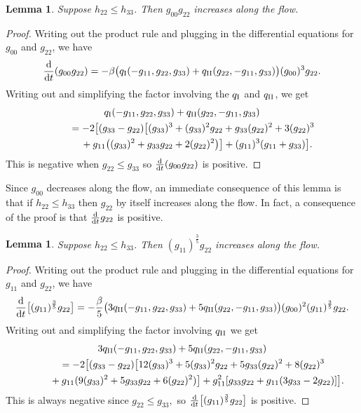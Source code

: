 \documentclass[pdftex]{sigma}
\numberwithin{equation}{section}
\newtheorem{Lemma}[Theorem]{Lemma}
\newcommand{\dtime}{\frac{{\rm d}}{{\rm d} t}} %
\begin{document}
\begin{Lemma} \label{g00g22prodlemma}
Suppose $h_{22} \leq h_{33}$. Then $g_{00} g_{22}$ increases along the flow.
\end{Lemma}
\begin{proof}
Writing out the product rule and plugging in the differential equations for $g_{00}$ and $g_{22}$, we have
\[
\dtime (g_{00} g_{22})
	= -\beta \bigl(q_{\rm I}(-g_{11}, g_{22}, g_{33}) + q_{\rm II}(g_{22}, -g_{11}, g_{33})\bigr) (g_{00})^3 g_{22}.
\]
Writing out and simplifying the factor involving the $q_{\rm I}$ and $q_{\rm II}$, we get
\begin{gather*}
q_{\rm I}(-g_{11}, g_{22}, g_{33}) + q_{\rm II}(g_{22}, -g_{11}, g_{33}) \\
 \qquad{} = -2\big[(g_{33}-g_{22})\big[(g_{33})^3 + (g_{33})^2 g_{22} + g_{33} (g_{22})^2 + 3(g_{22})^3 \\
 \qquad \quad {}+ g_{11}\big((g_{33})^2 + g_{33} g_{22} + 2(g_{22})^2\big)\big]
 + (g_{11})^3 (g_{11} + g_{33})\big].
\end{gather*}
This is negative when $g_{22} \leq g_{33}$ so $\dtime (g_{00} g_{22})$ is positive.
\end{proof}

Since $g_{00}$ decreases along the flow, an immediate consequence of this lemma is that if $h_{22} \leq h_{33}$ then $g_{22}$ by itself increases along the flow. In fact, a consequence of the proof is that $\dtime g_{22}$ is positive.

\begin{Lemma} \label{g11tothepg22prodlemma} Suppose $h_{22} \leq h_{33}$. Then $(g_{11})^{\frac{3}{5}} g_{22}$ increases along the flow.
\end{Lemma}
\begin{proof}
Writing out the product rule and plugging in the differential equations for $g_{11}$ and $g_{22}$, we have
\[
\dtime \big[(g_{11})^{\frac{3}{5}} g_{22} \big]
	= -\frac{\beta}{5} \bigl(3 q_{\rm II}(-g_{11}, g_{22}, g_{33}) + 5 q_{\rm II}(g_{22}, -g_{11}, g_{33}) \bigr) (g_{00})^2 (g_{11})^{\frac{3}{5}} g_{22}.
\]
Writing out and simplifying the factor involving $q_{\rm II}$ we get
\begin{gather*}
3 q_{\rm II}(-g_{11}, g_{22}, g_{33}) + 5 q_{\rm II}(g_{22}, -g_{11}, g_{33}) \\
\qquad{} = -2\big[(g_{33}-g_{22})\big[12(g_{33})^3 + 5(g_{33})^2g_{22} + 5g_{33}(g_{22})^2 + 8(g_{22})^3 \\
\qquad \quad {}+ g_{11}(9(g_{33})^2 + 5g_{33}g_{22} + 6(g_{22})^2)\big]
 + g_{11}^2[g_{33}g_{22} + g_{11}(3g_{33} - 2g_{22})] \big].
\end{gather*}
This is always negative since $g_{22} \leq g_{33},$ so $\dtime \big[(g_{11})^{\frac{3}{5}} g_{22} \big]$ is positive.
\end{proof}
\end{document}
